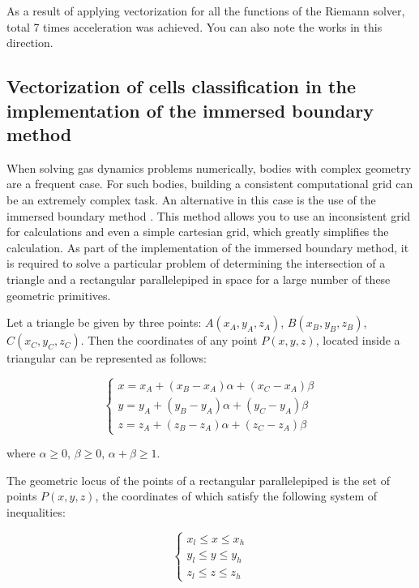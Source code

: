 \documentclass[
11pt,%
tightenlines,%
twoside,%
onecolumn,%
nofloats,%
nobibnotes,%
nofootinbib,%
superscriptaddress,%
noshowpacs,%
centertags]%
{revtex4}
\begin{document}
As a result of applying vectorization for all the functions of the Riemann solver, total 7 times acceleration was achieved.
You can also note the works \cite{BaderSWEVect,FerreiraSWEVect} in this direction.

\subsection{Vectorization of cells classification in the implementation of the immersed boundary method}

When solving gas dynamics problems numerically, bodies with complex geometry are a frequent case.
For such bodies, building a consistent computational grid can be an extremely complex task.
An alternative in this case is the use of the immersed boundary method \cite{MittalIBM,TsengIBM}.
This method allows you to use an inconsistent grid for calculations and even a simple cartesian grid, which greatly simplifies the calculation.
As part of the implementation of the immersed boundary method, it is required to solve a particular problem of determining the intersection of a triangle and a rectangular parallelepiped in space for a large number of these geometric primitives.

Let a triangle be given by three points: $A(x_A, y_A, z_A)$, $B(x_B, y_B, z_B)$, $C(x_C, y_C, z_C)$.
Then the coordinates of any point $P(x, y, z)$, located inside a triangular can be represented as follows:

\begin{equation}
\begin{cases}
x = x_A + (x_B - x_A)\alpha + (x_C - x_A)\beta \\
y = y_A + (y_B - y_A)\alpha + (y_C - y_A)\beta \\
z = z_A + (z_B - z_A)\alpha + (z_C - z_A)\beta
\end{cases}
\end{equation}

where $\alpha \ge 0$, $\beta \ge 0$, $\alpha + \beta \ge 1$.

The geometric locus of the points of a rectangular parallelepiped is the set of points $P(x, y, z)$, the coordinates of which satisfy the following system of inequalities:

\begin{equation}
\begin{cases}
x_l \le x \le x_h \\
y_l \le y \le y_h \\
z_l \le z \le z_h
\end{cases}
\end{equation}
\end{document}
